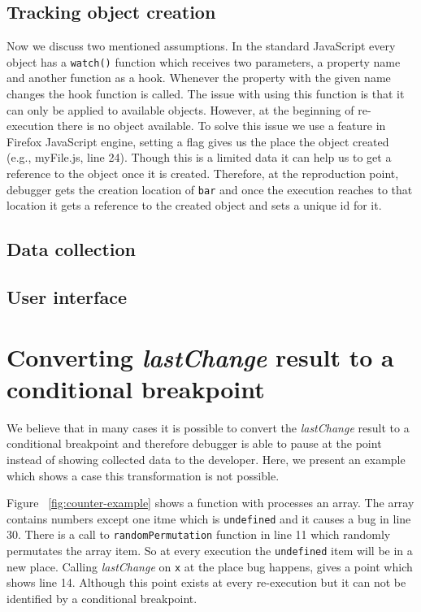 \documentclass[preprint]{sigplanconf}
\begin{document}
\subsection{Tracking object creation}
Now we discuss two mentioned assumptions. In the standard JavaScript every object has a \texttt{watch()} function which receives two parameters, a property name and another function as a hook. Whenever the property with the given name changes the hook function is called. The issue with using this function is that it can only be applied to available objects. However, at the beginning of re-execution there is no object available. To solve this issue we use a feature in Firefox JavaScript engine, setting a flag gives us the place the object created (e.g., myFile.js, line 24). Though this is a limited data it can help us to get a reference to the object once it is created. Therefore, at the reproduction point, debugger gets the creation location of \texttt{bar} and once the execution reaches to that location it gets a reference to the created object and sets a unique id for it.

\subsection{Data collection}

\subsection{User interface}

\section{Converting \textit{lastChange} result to a conditional breakpoint}
We believe that in many cases it is possible to convert the \textit{lastChange} result to a conditional breakpoint and therefore debugger is able to pause at the point
 instead of showing collected data to the developer. Here, we present an example which shows a case this transformation is not possible.

Figure ~\ref{fig:counter-example} shows a function with processes an array. The array contains numbers except one itme which is \texttt{undefined} and it causes a bug in line 30. There is a call to \texttt{randomPermutation} function in line 11 which randomly permutates the array item. So at every execution the \texttt{undefined} item will be in a new place. Calling \textit{lastChange} on \texttt{x} at the place bug happens, gives a point which shows line 14. Although this point exists at every re-execution but it can not be identified by a conditional breakpoint. 
\end{document}
